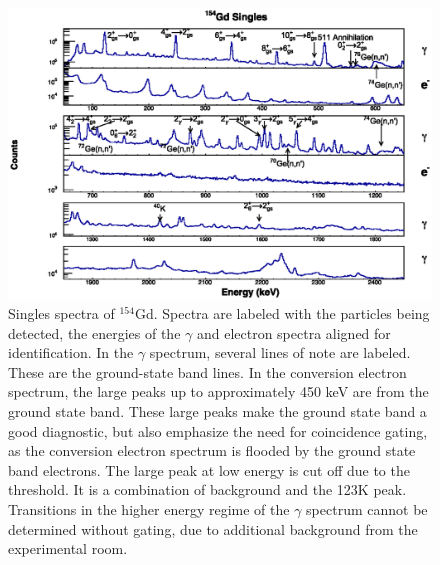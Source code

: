 \begin{figure}[!]
    \centering
    \includegraphics[scale=0.9]{154GdTablesAndFigs/154Gd_Singles_Label.eps}
    \caption[Singles spectra of $^{154}$Gd]{Singles spectra of $^{154}$Gd. Spectra are labeled with the particles being detected, the energies of the $\gamma$ and electron spectra aligned for identification. In the $\gamma$ spectrum, several lines of note are labeled. These are the ground-state band lines. In the conversion electron spectrum, the large peaks up to approximately 450 keV are from the ground state band. These large peaks make the ground state band a good diagnostic, but also emphasize the need for coincidence gating, as the conversion electron spectrum is flooded by the ground state band electrons. The large peak at low energy is cut off due to the threshold. It is a combination of background and the 123K peak. Transitions in the higher energy regime of the $\gamma$ spectrum cannot be determined without gating, due to additional background from the experimental room.}
    \label{fig:154Gd_Singles}
\end{figure}
